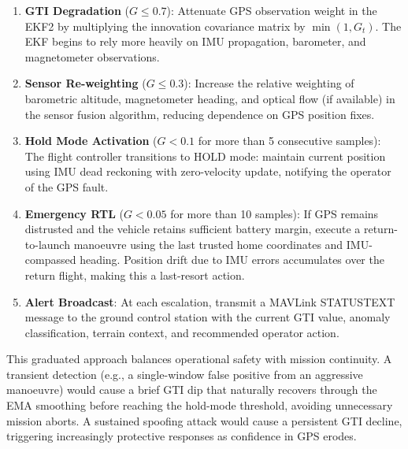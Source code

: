 \begin{enumerate}
    \item \textbf{GTI Degradation} (\(G \leq 0.7\)): Attenuate GPS observation weight in the EKF2 by multiplying the innovation covariance matrix by \(\min(1, G_t)\). The EKF begins to rely more heavily on IMU propagation, barometer, and magnetometer observations.
    \item \textbf{Sensor Re-weighting} (\(G \leq 0.3\)): Increase the relative weighting of barometric altitude, magnetometer heading, and optical flow (if available) in the sensor fusion algorithm, reducing dependence on GPS position fixes.
    \item \textbf{Hold Mode Activation} (\(G < 0.1\) for more than 5 consecutive samples): The flight controller transitions to HOLD mode: maintain current position using IMU dead reckoning with zero-velocity update, notifying the operator of the GPS fault.
    \item \textbf{Emergency RTL} (\(G < 0.05\) for more than 10 samples): If GPS remains distrusted and the vehicle retains sufficient battery margin, execute a return-to-launch manoeuvre using the last trusted home coordinates and IMU-compassed heading. Position drift due to IMU errors accumulates over the return flight, making this a last-resort action.
    \item \textbf{Alert Broadcast}: At each escalation, transmit a MAVLink STATUSTEXT message to the ground control station with the current GTI value, anomaly classification, terrain context, and recommended operator action.
\end{enumerate}

This graduated approach balances operational safety with mission continuity. A transient detection (e.g., a single-window false positive from an aggressive manoeuvre) would cause a brief GTI dip that naturally recovers through the EMA smoothing before reaching the hold-mode threshold, avoiding unnecessary mission aborts. A sustained spoofing attack would cause a persistent GTI decline, triggering increasingly protective responses as confidence in GPS erodes.
